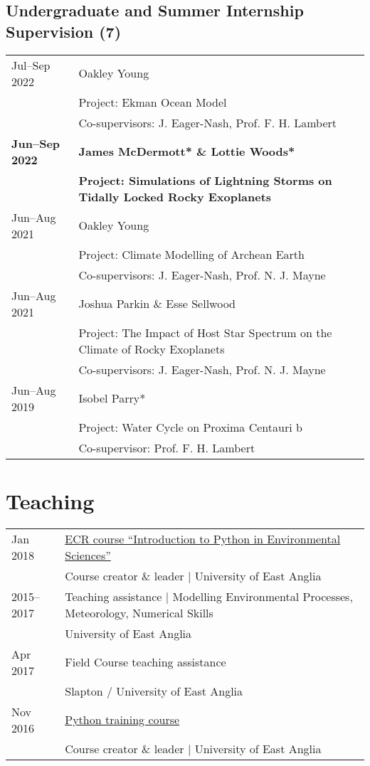 \documentclass[a4paper, 11pt]{article}
\newcommand{\highlight}[1]{\textbf{\textcolor{exeter_highlight_green}{#1}}}
\begin{document}
\subsection*{Undergraduate and Summer Internship Supervision (7)}
\begin{tabularx}{\linewidth}{@{}l X@{}}
Jul--Sep 2022 & Oakley Young \\
              & Project: Ekman Ocean Model \\
              & Co-supervisors: J. Eager-Nash, Prof. F. H. Lambert \\
\highlight{Jun--Sep 2022} & \highlight{James McDermott* \& Lottie Woods*} \\
                          & \highlight{Project: Simulations of Lightning Storms on Tidally Locked Rocky Exoplanets} \\
Jun--Aug 2021 & Oakley Young \\
              & Project: Climate Modelling of Archean Earth \\
              & Co-supervisors: J. Eager-Nash, Prof. N. J. Mayne \\
Jun--Aug 2021 & Joshua Parkin \& Esse Sellwood \\
              & Project: The Impact of Host Star Spectrum on the Climate of Rocky Exoplanets \\
              & Co-supervisors: J. Eager-Nash, Prof. N. J. Mayne \\
Jun--Aug 2019 & Isobel Parry* \\
              & Project: Water Cycle on Proxima Centauri b \\
              & Co-supervisor: Prof. F. H. Lambert \\
\end{tabularx}

\section{Teaching}
\begin{tabularx}{\linewidth}{@{}l X@{}}
Jan 2018 & \href{https://ueapy.github.io/pythoncourse2018}{ECR course ``Introduction to Python in Environmental Sciences''} \\ & Course creator \& leader | University of East Anglia \\
2015--2017 & Teaching assistance | Modelling Environmental Processes, Meteorology, Numerical Skills \\ & University of East Anglia \\
Apr 2017 & Field Course teaching assistance \\ & Slapton / University of East Anglia \\
Nov 2016 & \href{https://ueapy.github.io/enveast_python_course}{Python training course} \\ & Course creator \& leader | University of East Anglia \\
\end{tabularx}
\end{document}
